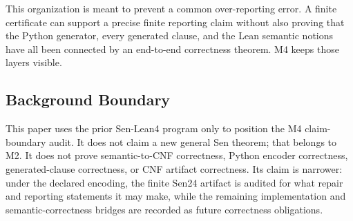 This organization is meant to prevent a common over-reporting error. A finite
certificate can support a precise finite reporting claim without also proving
that the Python generator, every generated clause, and the Lean semantic
notions have all been connected by an end-to-end correctness theorem. M4 keeps
those layers visible.

\subsection{Background Boundary}

This paper uses the prior Sen-Lean4 program only to position the M4
claim-boundary audit. It does not claim a new general Sen theorem; that belongs
to M2. It does not prove semantic-to-CNF correctness, Python encoder
correctness, generated-clause correctness, or CNF artifact correctness. Its
claim is narrower: under the declared encoding, the finite Sen24 artifact is
audited for what repair and reporting statements it may make, while the
remaining implementation and semantic-correctness bridges are recorded as
future correctness obligations.
